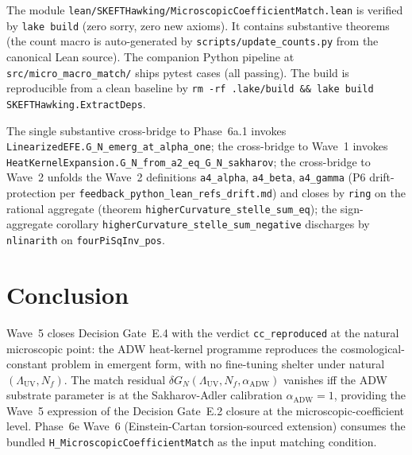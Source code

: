 \documentclass[twocolumn]{revtex4-2}
\newcommand{\Nf}{N_f}
\newcommand{\LambdaUV}{\Lambda_{\mathrm{UV}}}
\newcommand{\aADW}{\alpha_{\mathrm{ADW}}}
\newcommand{\GN}{G_{N}}
\begin{document}
The module
\texttt{lean/SKEFTHawking/MicroscopicCoefficientMatch.lean}
is verified by \texttt{lake build} (zero sorry, zero new
axioms). It contains \microscopicCoefficientMatchThms{} substantive
theorems (the count macro is auto-generated by
\texttt{scripts/update\_counts.py} from the canonical Lean source).
The companion Python pipeline at
\texttt{src/micro\_macro\_match/} ships
\microscopicCoefficientMatchTests{} pytest cases (all passing).
The build is reproducible from a clean baseline by
\texttt{rm -rf .lake/build \&\& lake build SKEFTHawking.ExtractDeps}.

The single substantive cross-bridge to Phase~6a.1 invokes
\texttt{LinearizedEFE.G\_N\_emerg\_at\_alpha\_one}; the
cross-bridge to Wave~1 invokes
\texttt{HeatKernelExpansion.G\_N\_from\_a2\_eq\_G\_N\_sakharov};
the cross-bridge to Wave~2 unfolds the Wave~2 definitions
\texttt{a4\_alpha}, \texttt{a4\_beta}, \texttt{a4\_gamma} (P6
drift-protection per
\texttt{feedback\_python\_lean\_refs\_drift.md}) and closes by
\texttt{ring} on the rational aggregate (theorem
\texttt{higherCurvature\_stelle\_sum\_eq}); the sign-aggregate
corollary \texttt{higherCurvature\_stelle\_sum\_negative}
discharges by \texttt{nlinarith} on \texttt{fourPiSqInv\_pos}.

\section{Conclusion}

Wave~5 closes Decision Gate~E.4 with the verdict
\texttt{cc\_reproduced} at the natural microscopic point: the
ADW heat-kernel programme reproduces the cosmological-constant
problem in emergent form, with no fine-tuning shelter under natural
$(\LambdaUV,\Nf)$. The match residual
$\delta\GN(\LambdaUV,\Nf,\aADW)$ vanishes iff the ADW substrate
parameter is at the Sakharov-Adler calibration $\aADW = 1$, providing
the Wave~5 expression of the Decision Gate~E.2 closure at the
microscopic-coefficient level. Phase~6e Wave~6 (Einstein-Cartan
torsion-sourced extension) consumes the bundled
\texttt{H\_MicroscopicCoefficientMatch} as the input matching
condition.
\end{document}
